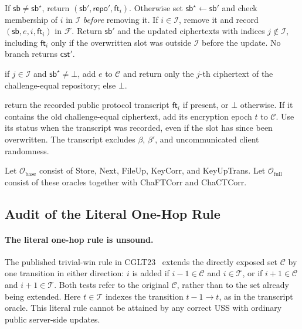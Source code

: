 \begin{description}[leftmargin=1.4em,style=nextline]
    If $\mathsf{sb}\neq\mathsf{sb}^\star$, return $(\mathsf{sb}',\mathsf{repo}',\mathsf{ft}_i)$. Otherwise set $\mathsf{sb}^\star\leftarrow\mathsf{sb}'$ and check membership of $i$ in $\mathcal I$ \emph{before} removing it. If $i\in\mathcal I$, remove it and record $(\mathsf{sb},e,i,\mathsf{ft}_i)$ in $\mathcal F$. Return $\mathsf{sb}'$ and the updated ciphertexts with indices $j\notin\mathcal I$, including $\mathsf{ft}_i$ only if the overwritten slot was outside $\mathcal I$ before the update. No branch returns $\mathsf{cst}'$.
  \item[$\mathcal{O}.\mathsf{ChaCTCorr}(j)$]
    if $j\in\mathcal{I}$ and $\mathsf{sb}^\star\neq\bot$, add $e$ to $\mathcal{C}$ and return only the $j$-th ciphertext of the challenge-equal repository; else $\bot$.
  \item[$\mathcal{O}.\mathsf{ChaFTCorr}(\mathsf{sb},t,i)$]
    return the recorded public protocol transcript $\mathsf{ft}_i$ if present, or $\bot$ otherwise. If it contains the old challenge-equal ciphertext, add its encryption epoch $t$ to $\mathcal C$. Use its status when the transcript was recorded, even if the slot has since been overwritten. The transcript excludes $\beta$, $\beta'$, and uncommunicated client randomness.
\end{description}

Let $\mathcal O_{\mathrm{base}}$ consist of Store, Next, FileUp, KeyCorr, and KeyUpTrans. Let $\mathcal O_{\mathrm{full}}$ consist of these oracles together with ChaFTCorr and ChaCTCorr.

\subsection{Audit of the Literal One-Hop Rule}

\paragraph{The literal one-hop rule is unsound.}
The published trivial-win rule in CGLT23~\cite[Sec.~3.2, p.~15]{CGLT23} extends the directly exposed set $\mathcal C$ by one transition in either direction: $i$ is added if $i-1\in\mathcal C$ and $i\in\mathcal T$, or if $i+1\in\mathcal C$ and $i+1\in\mathcal T$. Both tests refer to the original $\mathcal C$, rather than to the set already being extended. Here $t\in\mathcal T$ indexes the transition $t-1\to t$, as in the transcript oracle. This literal rule cannot be attained by any correct USS with ordinary public server-side updates.

